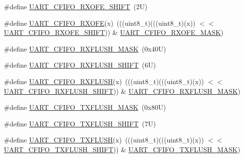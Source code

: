 \begin{DoxyCompactItemize}
\#define \mbox{\hyperlink{group___u_a_r_t___register___masks_ga94cc5cf08d8a44d028ec5ea5654d6742}{U\+A\+R\+T\+\_\+\+C\+F\+I\+F\+O\+\_\+\+R\+X\+O\+F\+E\+\_\+\+S\+H\+I\+FT}}~(2\+U)
\item 
\#define \mbox{\hyperlink{group___u_a_r_t___register___masks_ga641d6506471805bac4ffffe4293a52ce}{U\+A\+R\+T\+\_\+\+C\+F\+I\+F\+O\+\_\+\+R\+X\+O\+FE}}(x)~(((uint8\+\_\+t)(((uint8\+\_\+t)(x)) $<$$<$ \mbox{\hyperlink{group___u_a_r_t___register___masks_ga94cc5cf08d8a44d028ec5ea5654d6742}{U\+A\+R\+T\+\_\+\+C\+F\+I\+F\+O\+\_\+\+R\+X\+O\+F\+E\+\_\+\+S\+H\+I\+FT}})) \& \mbox{\hyperlink{group___u_a_r_t___register___masks_gae389d1934b5154ee403e78e80553e003}{U\+A\+R\+T\+\_\+\+C\+F\+I\+F\+O\+\_\+\+R\+X\+O\+F\+E\+\_\+\+M\+A\+SK}})
\item 
\#define \mbox{\hyperlink{group___u_a_r_t___register___masks_ga220d54d00fd7f64a3c31a9b593e4ffed}{U\+A\+R\+T\+\_\+\+C\+F\+I\+F\+O\+\_\+\+R\+X\+F\+L\+U\+S\+H\+\_\+\+M\+A\+SK}}~(0x40\+U)
\item 
\#define \mbox{\hyperlink{group___u_a_r_t___register___masks_gaa2254c7b026117f42b36539b526aca46}{U\+A\+R\+T\+\_\+\+C\+F\+I\+F\+O\+\_\+\+R\+X\+F\+L\+U\+S\+H\+\_\+\+S\+H\+I\+FT}}~(6\+U)
\item 
\#define \mbox{\hyperlink{group___u_a_r_t___register___masks_ga1ac863330ba7a63c7e7eccab10cd0c83}{U\+A\+R\+T\+\_\+\+C\+F\+I\+F\+O\+\_\+\+R\+X\+F\+L\+U\+SH}}(x)~(((uint8\+\_\+t)(((uint8\+\_\+t)(x)) $<$$<$ \mbox{\hyperlink{group___u_a_r_t___register___masks_gaa2254c7b026117f42b36539b526aca46}{U\+A\+R\+T\+\_\+\+C\+F\+I\+F\+O\+\_\+\+R\+X\+F\+L\+U\+S\+H\+\_\+\+S\+H\+I\+FT}})) \& \mbox{\hyperlink{group___u_a_r_t___register___masks_ga220d54d00fd7f64a3c31a9b593e4ffed}{U\+A\+R\+T\+\_\+\+C\+F\+I\+F\+O\+\_\+\+R\+X\+F\+L\+U\+S\+H\+\_\+\+M\+A\+SK}})
\item 
\#define \mbox{\hyperlink{group___u_a_r_t___register___masks_ga026f6169c18280c4dd4fb93d5b3bf400}{U\+A\+R\+T\+\_\+\+C\+F\+I\+F\+O\+\_\+\+T\+X\+F\+L\+U\+S\+H\+\_\+\+M\+A\+SK}}~(0x80\+U)
\item 
\#define \mbox{\hyperlink{group___u_a_r_t___register___masks_gaebc78a602339988f0960140aeeca4d93}{U\+A\+R\+T\+\_\+\+C\+F\+I\+F\+O\+\_\+\+T\+X\+F\+L\+U\+S\+H\+\_\+\+S\+H\+I\+FT}}~(7\+U)
\item 
\#define \mbox{\hyperlink{group___u_a_r_t___register___masks_gaeb1ccf62a67ec3c74e6b6651b7604fb7}{U\+A\+R\+T\+\_\+\+C\+F\+I\+F\+O\+\_\+\+T\+X\+F\+L\+U\+SH}}(x)~(((uint8\+\_\+t)(((uint8\+\_\+t)(x)) $<$$<$ \mbox{\hyperlink{group___u_a_r_t___register___masks_gaebc78a602339988f0960140aeeca4d93}{U\+A\+R\+T\+\_\+\+C\+F\+I\+F\+O\+\_\+\+T\+X\+F\+L\+U\+S\+H\+\_\+\+S\+H\+I\+FT}})) \& \mbox{\hyperlink{group___u_a_r_t___register___masks_ga026f6169c18280c4dd4fb93d5b3bf400}{U\+A\+R\+T\+\_\+\+C\+F\+I\+F\+O\+\_\+\+T\+X\+F\+L\+U\+S\+H\+\_\+\+M\+A\+SK}})
\end{DoxyCompactItemize}
